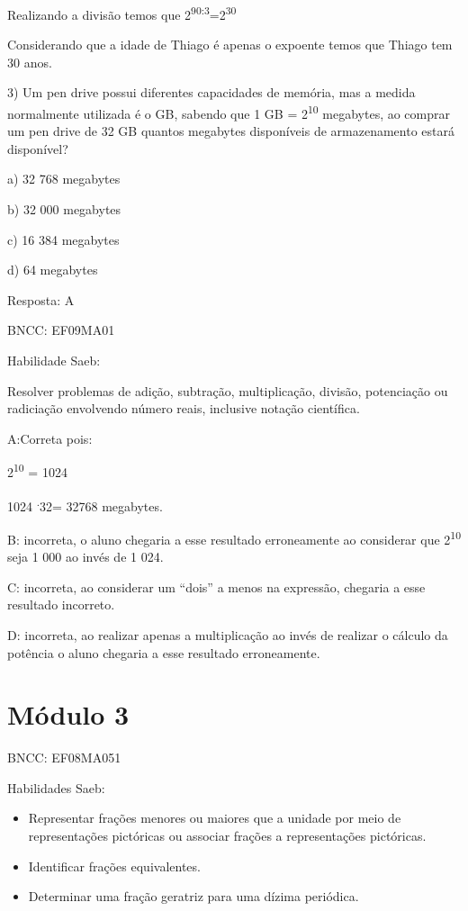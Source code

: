 Realizando a divisão temos que
2\textsuperscript{90:3}=2\textsuperscript{30}

Considerando que a idade de Thiago é apenas o expoente temos que Thiago
tem 30 anos.

3) Um pen drive possui diferentes capacidades de memória, mas a medida
normalmente utilizada é o GB, sabendo que 1 GB = 2\textsuperscript{10}
megabytes, ao comprar um pen drive de 32 GB quantos megabytes
disponíveis de armazenamento estará disponível?

a) 32 768 megabytes

b) 32 000 megabytes

c) 16 384 megabytes

d) 64 megabytes

Resposta: A

BNCC: EF09MA01

Habilidade Saeb:

Resolver problemas de adição, subtração, multiplicação, divisão,
potenciação ou radiciação envolvendo número reais, inclusive notação
científica.

A:Correta pois:

2\textsuperscript{10} = 1024

1024 \textsuperscript{.}32= 32768 megabytes.

B: incorreta, o aluno chegaria a esse resultado erroneamente ao
considerar que 2\textsuperscript{10} seja 1 000 ao invés de 1 024.

C: incorreta, ao considerar um ``dois'' a menos na expressão, chegaria a
esse resultado incorreto.

D: incorreta, ao realizar apenas a multiplicação ao invés de realizar o
cálculo da potência o aluno chegaria a esse resultado erroneamente.

\hypertarget{muxf3dulo-3}{%
\section{Módulo 3}\label{muxf3dulo-3}}

BNCC: EF08MA051

Habilidades Saeb:

\begin{itemize}
\item
  Representar frações menores ou maiores que a unidade por meio de
  representações pictóricas ou associar frações a representações
  pictóricas.
\item
  Identificar frações equivalentes.
\item
  Determinar uma fração geratriz para uma dízima periódica.
\end{itemize}


